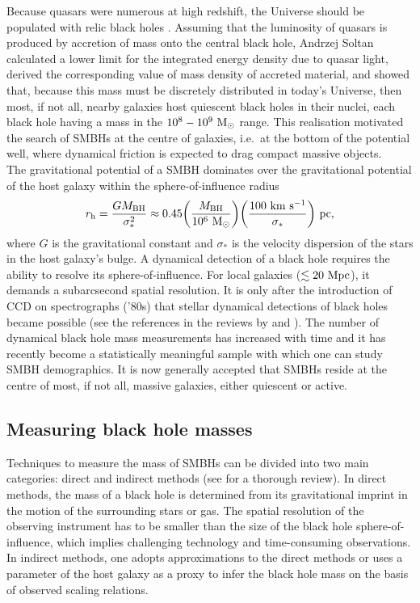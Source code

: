 Because quasars were numerous at high redshift, the Universe should be populated with relic black holes \citep{soltan1982}. 
Assuming that the luminosity of quasars is produced by accretion of mass onto the central black hole, 
Andrzej Soltan calculated a lower limit for the integrated energy density due to quasar light, 
derived the corresponding value of mass density of accreted material, 
and showed that, because this mass must be discretely distributed in today's Universe, 
then most, if not all, nearby galaxies host quiescent black holes in their nuclei, 
each black hole having a mass in the $10^8 - 10^9~\rm M_{\odot}$ range. 
This realisation motivated the search of SMBHs at the centre of galaxies, 
i.e.~at the bottom of the potential well, 
where dynamical friction is expected to drag compact massive objects. \\

The gravitational potential of a SMBH dominates over the gravitational potential of the host galaxy within the 
sphere-of-influence radius 
\begin{equation}
r_{\rm h} = \frac{G M_{\rm BH}}{\sigma_*^2} \approx 0.45 \biggl ( \frac{M_{\rm BH}}{10^6 \rm~M_{\odot}} \biggr ) 
\biggl ( \frac{100 \rm~km~s^{-1}}{\sigma_*} \biggr ) \rm~pc ,
\end{equation}
where $G$ is the gravitational constant and $\sigma_*$ is the velocity dispersion of the stars in the 
host galaxy's bulge.
A dynamical detection of a black hole requires the ability to resolve its sphere-of-influence.
For local galaxies ($\lesssim 20~\rm Mpc$), it demands a subarcsecond spatial resolution.
It is only after the introduction of CCD on spectrographs ('80s) that stellar dynamical 
detections of black holes became possible (see the references in the reviews by 
\citealt{kormendyrichstone1995} and \citealt{richstone1998}).
The number of dynamical black hole mass measurements has increased with time and it has recently become a 
statistically meaningful sample with which one can study SMBH demographics. 
It is now generally accepted that SMBHs reside at the centre of most, if not all, 
massive galaxies, either quiescent or active. 


\subsection{Measuring black hole masses}
Techniques to measure the mass of SMBHs can be divided into two main categories: direct and indirect methods 
(see \citealt{ferrareseford2005} for a thorough review). 
In direct methods, the mass of a black hole is determined from its gravitational imprint 
in the motion of the surrounding stars or gas. 
The spatial resolution of the observing instrument has to be smaller than the size of the black hole sphere-of-influence, 
which implies challenging technology and time-consuming observations. 
In indirect methods, one adopts approximations to the direct methods 
or uses a parameter of the host galaxy as a proxy to infer the black hole mass 
on the basis of observed scaling relations. \\

